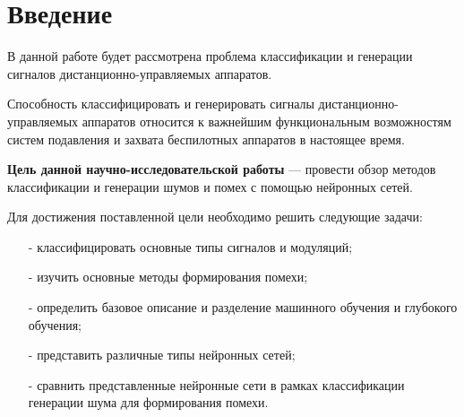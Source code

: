 \chapter*{Введение}

В данной работе будет рассмотрена проблема классификации и генерации сигналов дистанционно-управляемых аппаратов.

Способность классифицировать и генерировать сигналы дистанционно-управляемых аппаратов относится к важнейшим функциональным возможностям систем подавления и захвата беспилотных аппаратов в настоящее время.

\textbf{Цель данной научно-исследовательской работы} --- провести обзор методов классификации и генерации шумов и помех с помощью нейронных сетей.


Для достижения поставленной цели необходимо решить следующие задачи:
\begin{itemize}
	\item[-] классифицировать основные типы сигналов и модуляций;
	\item[-] изучить основные методы формирования помехи;
	\item[-] определить базовое описание и разделение машинного обучения и глубокого обучения;
	\item[-] представить различные типы нейронных сетей;
	\item[-] сравнить представленные нейронные сети в рамках классификации генерации шума для формирования помехи.
\end{itemize}